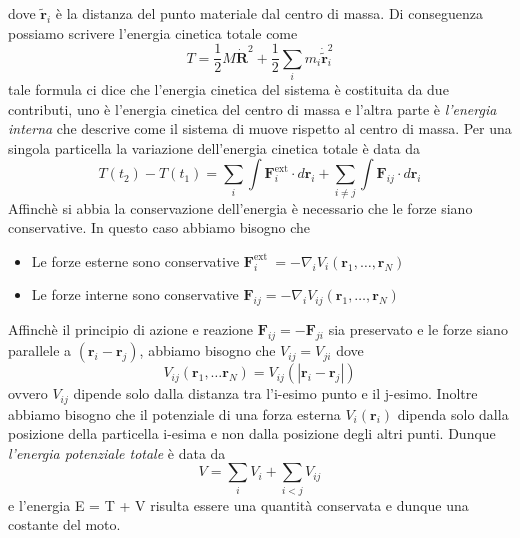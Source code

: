dove $\tilde{\bm{r}}_i$ \`{e} la distanza del punto materiale dal centro di massa. Di conseguenza possiamo scrivere l'energia cinetica totale come 
\begin{equation}
T=\frac{1}{2} M \dot{\mathbf{R}}^2+\frac{1}{2} \sum_i m_i \dot{\tilde{\mathbf{r}}}_i^2
\end{equation}
tale formula ci dice che l'energia cinetica del sistema \`{e} costituita da due contributi, uno \`{e} l'energia cinetica del centro di massa e l'altra parte \`{e} \textit{l'energia interna} che descrive come il sistema di muove rispetto al centro di massa. Per una singola particella la variazione dell'energia cinetica totale \`{e} data da 
\begin{equation}
T\left(t_2\right)-T\left(t_1\right)=\sum_i \int \mathbf{F}_i^{\mathrm{ext}} \cdot d \mathbf{r}_i+\sum_{i \neq j} \int \mathbf{F}_{i j} \cdot d \mathbf{r}_i
\end{equation}
Affinch\`{e} si abbia la conservazione dell'energia \`{e} necessario che le forze siano conservative. In questo caso abbiamo bisogno che 
\begin{itemize}
	\item Le forze esterne sono conservative $\mathbf{F}_i^{\text {ext }}=-\nabla_i V_i\left(\mathbf{r}_1, \ldots, \mathbf{r}_N\right)$
	\item Le forze interne sono conservative $\mathbf{F}_{i j}=-\nabla_i V_{i j}\left(\mathbf{r}_1, \ldots, \mathbf{r}_N\right)$ 
\end{itemize}
Affinch\`{e} il principio di azione e reazione $\bm{F}_{ij} = - \bm{F}_{ji}$ sia preservato e le forze siano parallele a $(\bm{r}_i -\bm{r}_j)$, abbiamo bisogno che $V_{ij} = V_{ji}$ dove 
\begin{equation}
V_{i j}\left(\mathbf{r}_1, \ldots \mathbf{r}_N\right)=V_{i j}\left(\left|\mathbf{r}_i-\mathbf{r}_j\right|\right)
\end{equation}
ovvero $V_{ij}$ dipende solo dalla distanza tra l'i-esimo punto e il j-esimo. Inoltre abbiamo bisogno che il potenziale di una forza esterna $V_i(\bm{r}_i)$ dipenda solo dalla posizione della particella i-esima e non dalla posizione degli altri punti. Dunque \textit{l'energia potenziale totale} \`{e} data da 
\begin{equation}
V=\sum_i V_i+\sum_{i<j} V_{i j}
\end{equation}
e l'energia E = T + V risulta essere una quantit\`{a} conservata e dunque una costante del moto.


